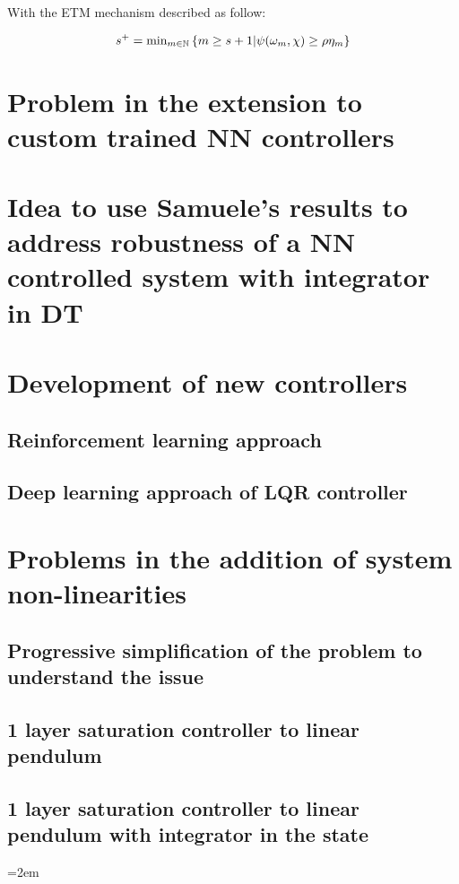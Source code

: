 \documentclass{article}
\begin{document}
With the ETM mechanism described as follow:

$$
s^{+} = \text{min}_{m \in {\mathbb{N}}} \left\{ m \geq s + 1 | \psi(\omega_m, \chi) \geq \rho \eta_m \right\}
$$


\section*{Problem in the extension to custom trained NN controllers}

\section*{Idea to use Samuele's results to address robustness of a NN controlled system with integrator in DT}

\section*{Development of new controllers}

\subsection*{Reinforcement learning approach}

\subsection*{Deep learning approach of LQR controller} 

\section*{Problems in the addition of system non-linearities} 

\subsection*{Progressive simplification of the problem to understand the issue}

\subsection*{1 layer saturation controller to linear pendulum}

\subsection*{1 layer saturation controller to linear pendulum with integrator in the state}



\pagebreak
\emergencystretch=2em %
\printbibliography
\end{document}
